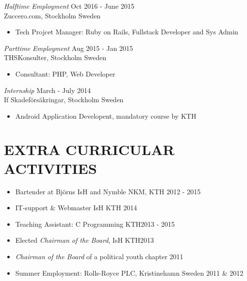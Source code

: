 \documentclass[margin]{res}
\begin{document}
\begin{resume}
{\sl Halftime Employment } \hfill  Oct 2016 - June 2015 \\
                Zuccero.com, Stockholm Sweden
                 \begin{itemize}  \itemsep -3pt %
                 \item  Tech Projcet Manager: Ruby on Rails, Fullstack Developer and Sys Admin\hfill 
                \end{itemize}
{\sl Parttime Employment } \hfill  Aug 2015 - Jan 2015 \\
                THSKonsulter, Stockholm Sweden
                 \begin{itemize}  \itemsep -3pt %
                 \item  Consultant: PHP, Web Developer\hfill 
                \end{itemize}
    {\sl Internship } \hfill March - July 2014 \\
                If Skadeförsäkringar, Stockholm Sweden
                 \begin{itemize}  \itemsep -3pt %
                 \item Android Application Developent, mandatory course by KTH 
                \end{itemize}        

\section{EXTRA CURRICULAR ACTIVITIES }
\begin{itemize}  \itemsep -3pt
            \item Bartender at Björns IsH and Nymble NKM, KTH \hfill 2012 - 2015 
            \item IT-support \& Webmaster IsH  KTH \hfill 2014 
            \item Teaching Assistant: C Programming KTH\hfill 2013 - 2015
            \item Elected {\it Chairman of the Board},  IsH KTH\hfill 2013 
            \item {\it Chairman of the Board} of a  political youth chapter \hfill 2011
            \item Summer Employment: Rolls-Royce PLC, Kristinehamn Sweden \hfill 2011 \& 2012
\end{itemize}

\end{resume}
\end{document}
